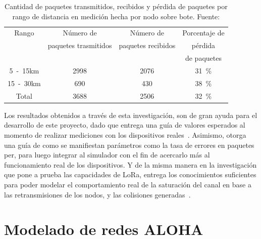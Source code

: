 \begin{justify}
\begin{table}[!ht]
\centering
\begin{tabular}{|c|c|c|c|}
\hline
Rango & Número de            & Número de          & Porcentaje de  \\
      & paquetes trasmitidos & paquetes recibidos &  pérdida\\ 
      &                      &                    &   de paquetes \\ \hline
\si{5-15}{km} & \num{2998} & \num{2076} & \SI{31}{\percent} \\ \hline
\si{15-30}{km} & \num{690} & \num{430} & \SI{38}{\percent} \\ \hline
Total & \num{3688} & \num{2506} & \SI{32}{\percent} \\ \hline
\end{tabular}
\caption{Cantidad de paquetes transmitidos, recibidos y pérdida de paquetes por rango de distancia en medición hecha por nodo sobre bote. Fuente:\cite{Juha}}
\label{arte:4}
\end{table}

Los resultados obtenidos a través de esta investigación, son de gran ayuda para el desarrollo de este proyecto, dado que entrega una guía de valores esperados al momento de realizar mediciones con los dispositivos reales~\cite{Juha}. Asimismo, otorga una guía de como se manifiestan parámetros como la tasa de errores en paquetes \gls{per}, para luego integrar al simulador con el fin de acercarlo más al funcionamiento real de los dispositivos. Y de la misma manera en la investigación que pone a prueba las capacidades de LoRa, entrega los conocimientos suficientes para poder modelar el comportamiento real de la saturación del canal en base a las retransmisiones de los nodos, y las colisiones generadas~\cite{Xavier}.
\section{Modelado de redes ALOHA}


\end{justify}
